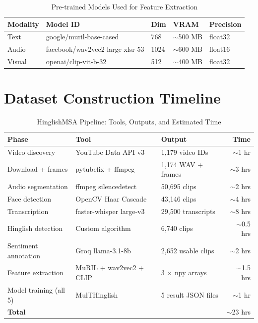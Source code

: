 \begin{appendices}
    \begin{table}[H]
    \centering
    \caption{Pre-trained Models Used for Feature Extraction}
    \begin{tabular}{lllll}
    \toprule
    \textbf{Modality} & \textbf{Model ID} & \textbf{Dim} & \textbf{VRAM} & \textbf{Precision} \\
    \midrule
    Text & google/muril-base-cased & 768 & $\sim$500 MB & float32 \\
    Audio & facebook/wav2vec2-large-xlsr-53 & 1024 & $\sim$600 MB & float16 \\
    Visual & openai/clip-vit-b-32 & 512 & $\sim$400 MB & float32 \\
    \bottomrule
    \end{tabular}
    \end{table}

    \section{Dataset Construction Timeline}

    \begin{table}[H]
    \centering
    \caption{HinglishMSA Pipeline: Tools, Outputs, and Estimated Time}
    \begin{tabular}{p{3cm} p{3cm} p{3.5cm} r}
    \toprule
    \textbf{Phase} & \textbf{Tool} & \textbf{Output} & \textbf{Time} \\
    \midrule
    Video discovery & YouTube Data API v3 & 1,179 video IDs & $\sim$1 hr \\
    Download + frames & pytubefix + ffmpeg & 1,174 WAV + frames & $\sim$3 hrs \\
    Audio segmentation & ffmpeg silencedetect & 50,695 clips & $\sim$2 hrs \\
    Face detection & OpenCV Haar Cascade & 43,146 clips & $\sim$4 hrs \\
    Transcription & faster-whisper large-v3 & 29,500 transcripts & $\sim$8 hrs \\
    Hinglish detection & Custom algorithm & 6,740 clips & $\sim$0.5 hrs \\
    Sentiment annotation & Groq llama-3.1-8b & 2,652 usable clips & $\sim$2 hrs \\
    Feature extraction & MuRIL + wav2vec2 + CLIP & 3 $\times$ npy arrays & $\sim$1.5 hrs \\
    Model training (all 5) & MulTHinglish & 5 result JSON files & $\sim$1 hr \\
    \midrule
    \textbf{Total} & & & $\sim$23 hrs \\
    \bottomrule
    \end{tabular}
    \end{table}


\end{appendices}
